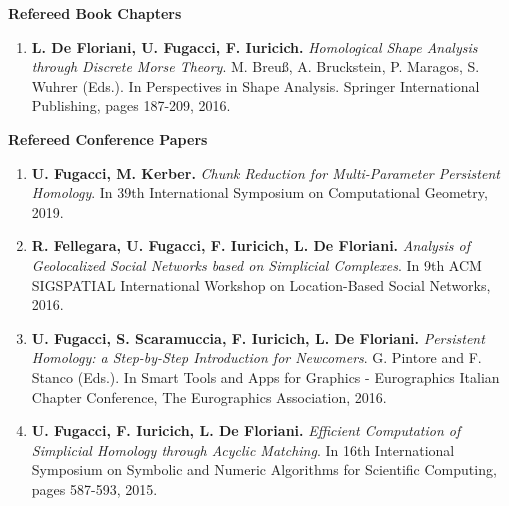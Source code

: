 \documentclass[11pt]{article}
\begin{document}
\noindent
{\bf Refereed Book Chapters}

\begin{enumerate}

\item {\bf L. De Floriani, U. Fugacci, F. Iuricich.} {\em Homological Shape Analysis through Discrete Morse Theory}.  M. Breu{\ss}, A. Bruckstein, P. Maragos, S. Wuhrer (Eds.). In Perspectives in Shape Analysis. Springer International Publishing, pages 187-209, 2016.

\end{enumerate}
\vspace*{3ex}

\noindent
{\bf Refereed Conference Papers}
\begin{enumerate}

\item {\bf U. Fugacci, M. Kerber.} {\em Chunk Reduction for Multi-Parameter Persistent Homology}. In 39th International Symposium on Computational Geometry, 2019.

\item {\bf R. Fellegara, U. Fugacci, F. Iuricich, L. De Floriani.} {\em Analysis of Geolocalized Social Networks based on Simplicial Complexes}. In 9th ACM SIGSPATIAL International Workshop on Location-Based Social Networks, 2016.

\item {\bf U. Fugacci, S. Scaramuccia, F. Iuricich, L. De Floriani.} {\em Persistent Homology: a Step-by-Step Introduction for Newcomers}. G. Pintore and F. Stanco (Eds.). In Smart Tools and Apps for Graphics - Eurographics Italian Chapter Conference, The Eurographics Association, 2016.

\item {\bf U. Fugacci, F. Iuricich, L. De Floriani.} {\em Efficient Computation of Simplicial Homology through Acyclic Matching}. In 16th International Symposium on Symbolic and Numeric Algorithms for Scientific Computing, pages 587-593, 2015.

\end{enumerate}
\vspace*{1ex}
\end{document}
